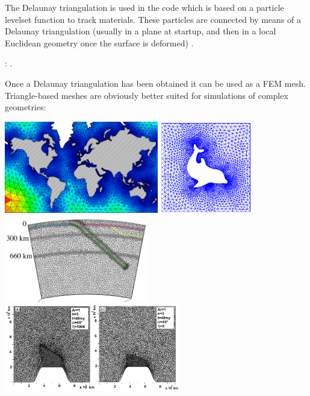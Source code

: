 The Delaunay triangulation is used in the \douar code which is based on a particle levelset function to track materials. These particles are connected by means of a Delaunay triangulation (usually in a plane at startup, and then in a local Euclidean geometry once the surface is deformed) \cite{brtf08}.

\Literature: \cite{gebo}.


Once a Delaunay triangulation has been obtained it can be used as a FEM mesh.  
Triangle-based meshes are obviously better suited for simulations of complex geometries:
\begin{center}
\includegraphics[height=4cm]{images/meshes/tr1}
\includegraphics[height=4cm]{images/meshes/dolfin}\\
\includegraphics[height=3.8cm]{images/meshes/gebk12}\cite{gebk12}
\includegraphics[height=3.8cm]{images/meshes/rost05a}\cite{rost05a}
\end{center}

